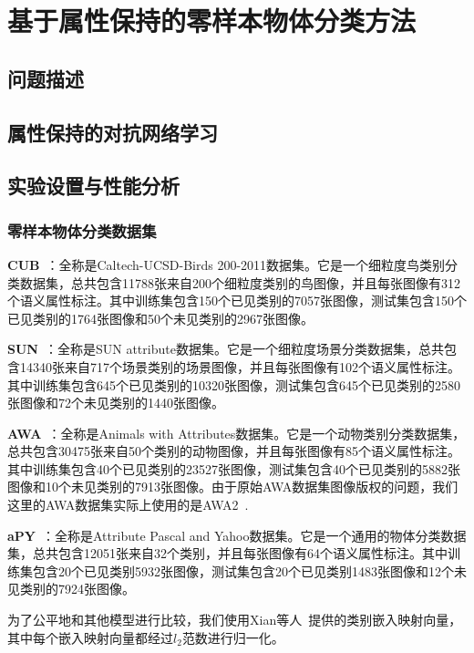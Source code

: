 \chapter{基于属性保持的零样本物体分类方法}


\section{问题描述}

\section{属性保持的对抗网络学习}


\section{实验设置与性能分析}
\subsection{零样本物体分类数据集}
\textbf{CUB}~\cite{wah2011caltech}：全称是Caltech-UCSD-Birds 200-2011数据集。它是一个细粒度鸟类别分类数据集，总共包含11788张来自200个细粒度类别的鸟图像，并且每张图像有312个语义属性标注。其中训练集包含150个已见类别的7057张图像，测试集包含150个已见类别的1764张图像和50个未见类别的2967张图像。

\textbf{SUN}~\cite{patterson2012sun}：全称是SUN attribute数据集。它是一个细粒度场景分类数据集，总共包含14340张来自717个场景类别的场景图像，并且每张图像有102个语义属性标注。其中训练集包含645个已见类别的10320张图像，测试集包含645个已见类别的2580张图像和72个未见类别的1440张图像。

\textbf{AWA}~\cite{lampert2009learning}：全称是Animals with Attributes数据集。它是一个动物类别分类数据集，总共包含30475张来自50个类别的动物图像，并且每张图像有85个语义属性标注。其中训练集包含40个已见类别的23527张图像，测试集包含40个已见类别的5882张图像和10个未见类别的7913张图像。由于原始AWA数据集图像版权的问题，我们这里的AWA数据集实际上使用的是AWA2~\cite{xian2017zero}.

\textbf{aPY}~\cite{farhadi2009describing}：全称是Attribute Pascal and Yahoo数据集。它是一个通用的物体分类数据集，总共包含12051张来自32个类别，并且每张图像有64个语义属性标注。其中训练集包含20个已见类别5932张图像，测试集包含20个已见类别1483张图像和12个未见类别的7924张图像。

为了公平地和其他模型进行比较，我们使用Xian等人~\cite{xian2017zero}提供的类别嵌入映射向量，其中每个嵌入映射向量都经过$l_2$范数进行归一化。


